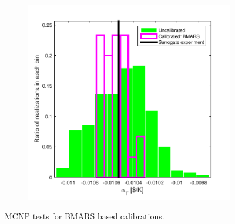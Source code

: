 \documentclass[review]{elsarticle}
\begin{document}
\begin{figure}[ht!]
\begin{subfigure}{0.5\textwidth}
\label{bmlam}
\end{subfigure}
~
\begin{subfigure}{0.5\textwidth}
\centering
\includegraphics[width=0.9\linewidth]{NSE15-48R1_Figure16c.pdf}
\label{bmalp}
\end{subfigure}
\caption{MCNP tests for BMARS based calibrations.}
\label{ttbmars}
\end{figure}
\end{document}
